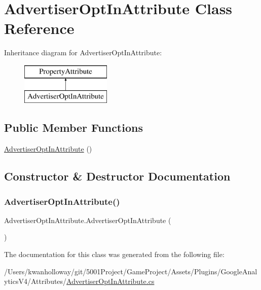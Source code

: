 \hypertarget{class_advertiser_opt_in_attribute}{}\section{Advertiser\+Opt\+In\+Attribute Class Reference}
\label{class_advertiser_opt_in_attribute}
Inheritance diagram for Advertiser\+Opt\+In\+Attribute\+:\begin{figure}[H]
\begin{center}
\leavevmode
\includegraphics[height=2.000000cm]{class_advertiser_opt_in_attribute}
\end{center}
\end{figure}
\subsection*{Public Member Functions}
\begin{DoxyCompactItemize}
\item 
\hyperlink{class_advertiser_opt_in_attribute_a080b10f54b6b50696bd9313d176237d1}{Advertiser\+Opt\+In\+Attribute} ()
\end{DoxyCompactItemize}


\subsection{Constructor \& Destructor Documentation}
\mbox{\label{class_advertiser_opt_in_attribute_a080b10f54b6b50696bd9313d176237d1}} 
\subsubsection{\texorpdfstring{Advertiser\+Opt\+In\+Attribute()}{AdvertiserOptInAttribute()}}
{\footnotesize\ttfamily Advertiser\+Opt\+In\+Attribute.\+Advertiser\+Opt\+In\+Attribute (\begin{DoxyParamCaption}{ }\end{DoxyParamCaption})}



The documentation for this class was generated from the following file\+:\begin{DoxyCompactItemize}
\item 
/\+Users/kwanholloway/git/5001\+Project/\+Game\+Project/\+Assets/\+Plugins/\+Google\+Analytics\+V4/\+Attributes/\hyperlink{_advertiser_opt_in_attribute_8cs}{Advertiser\+Opt\+In\+Attribute.\+cs}\end{DoxyCompactItemize}
